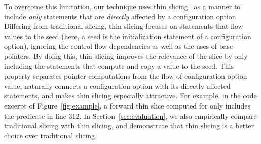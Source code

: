 
To overcome this limitation, our technique uses thin
slicing~\cite{Sridharan:2007} as a manner to include
\textit{only} statements that are \textit{directly} affected by a configuration option.
Differing from traditional slicing, thin slicing
focuses on statements that flow values to the seed (here, a
seed is the initialization statement of a configuration option), ignoring the 
control flow dependencies as well as the uses of
base pointers. By doing this, thin slicing improves the relevance
of the slice by only including the statements that compute
and copy a value to the seed.
This property separates
pointer computations from the flow of configuration option value,
naturally connects a configuration option with its
directly affected statements, and makes thin slicing
especially attractive.
For example, in the code excerpt of Figure~\ref{fig:example},
a forward thin slice computed for 
only includes the predicate in line 312.
In Section~\ref{sec:evaluation}, 
we also empirically compare traditional slicing with
thin slicing, and demonstrate that thin slicing is a better choice
over traditional slicing.




% 
